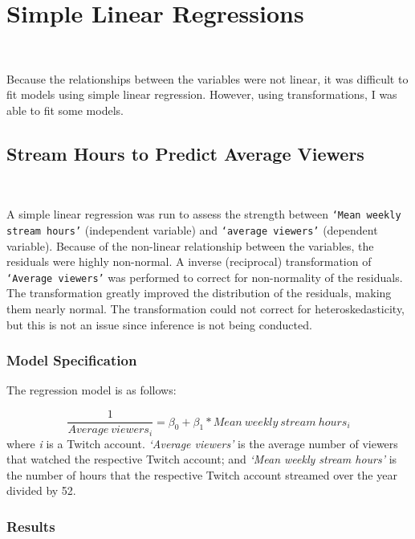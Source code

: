 \documentclass[12pt]{article}
\begin{document}
\section{Simple Linear Regressions}\

Because the relationships between the variables were not linear, it was difficult to fit models using simple linear regression. However, using transformations, I was able to fit some models.

\subsection{Stream Hours to Predict Average Viewers}\

A simple linear regression was run to assess the strength between \texttt{`Mean weekly stream hours’} (independent variable) and \texttt{`average viewers’} (dependent variable). Because of the non-linear relationship between the variables, the residuals were highly non-normal. A inverse (reciprocal) transformation of \texttt{`Average viewers’} was performed to correct for non-normality of the residuals. The transformation greatly improved the distribution of the residuals, making them nearly normal. The transformation could not correct for heteroskedasticity, but this is not an issue since inference is not being conducted.

\subsubsection{Model Specification}

The regression model is as follows:

\begin{equation}
\dfrac{1}{Average\ viewers_{i}} = \beta_{0} + \beta_{1} \ast Mean\ weekly\ stream\ hours_{i} 
\end{equation}
where \textit{i} is a Twitch account. \textit{`Average viewers'} is the average number of viewers that watched the respective Twitch account; and \textit{`Mean weekly stream hours'} is the number of hours that the respective Twitch account streamed over the year divided by 52.

\subsubsection{Results}\

\end{document}
